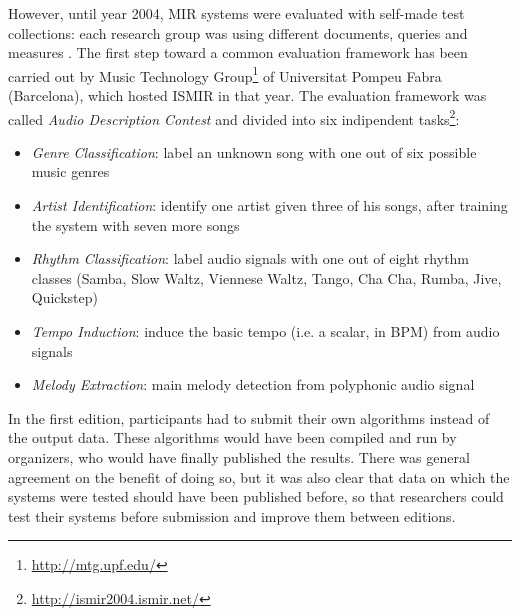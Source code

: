 However, until year 2004, MIR systems were evaluated with self-made test collections: each research group was using different documents, queries and measures \cite{orio06}. The first step toward a common evaluation framework has been carried out by Music Technology Group\footnote{\url{http://mtg.upf.edu/}} of Universitat Pompeu Fabra (Barcelona), which hosted ISMIR in that year. The evaluation framework was called \textit{Audio Description Contest} and divided into six indipendent tasks\footnote{\url{http://ismir2004.ismir.net/}}: 
\begin{itemize}
\item \textit{Genre Classification}: label an unknown song with one out of six possible music genres
\item \textit{Artist Identification}: identify one artist given three of his songs, after training the system with seven more songs 
\item \textit{Rhythm Classification}: label audio signals with one out of eight rhythm classes (Samba, Slow Waltz, Viennese Waltz, Tango, Cha Cha, Rumba, Jive, Quickstep)
\item \textit{Tempo Induction}: induce the basic tempo (i.e. a scalar, in BPM) from audio signals
\item \textit{Melody Extraction}: main melody detection from polyphonic audio signal
\end{itemize}
In the first edition, participants had to submit their own algorithms instead of the output data. These algorithms would have been compiled and run by organizers, who would have finally published the results. There was general agreement on the benefit of doing so, but it was also clear that data on which the systems were tested should have been published before, so that researchers could test their systems before submission and improve them between editions. 
